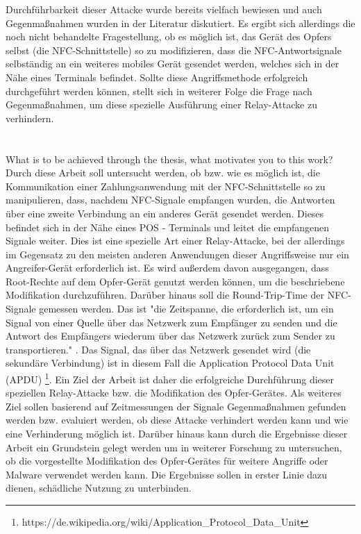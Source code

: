 \documentclass[a4paper,10pt,ngerman]{INSOexpose}
\begin{document}
{Durchführbarkeit dieser Attacke wurde bereits vielfach bewiesen und auch Gegenmaßnahmen wurden in der Literatur diskutiert. Es ergibt sich allerdings die noch nicht behandelte Fragestellung, ob es möglich ist, das Gerät des Opfers selbst (die NFC-Schnittstelle) so zu modifizieren, dass die NFC-Antwortsignale selbständig an ein weiteres mobiles Gerät gesendet werden, welches sich in der Nähe eines Terminals befindet. Sollte diese Angriffsmethode erfolgreich durchgeführt werden können, stellt sich in weiterer Folge die Frage nach Gegenmaßnahmen, um diese spezielle Ausführung einer Relay-Attacke zu verhindern. 
}
\section{}

\langchooser
{
	What is to be achieved through the thesis, what motivates you to this work?
}
{
	Durch diese Arbeit soll untersucht werden, ob bzw. wie es möglich ist, die Kommunikation einer Zahlungsanwendung mit der NFC-Schnittstelle so zu manipulieren, dass, nachdem NFC-Signale empfangen wurden, die Antworten über eine zweite Verbindung an ein anderes Gerät gesendet werden. Dieses befindet sich in der Nähe eines POS - Terminals und leitet die empfangenen Signale weiter. Dies ist eine spezielle Art einer Relay-Attacke, bei der allerdings im Gegensatz zu den meisten anderen Anwendungen dieser Angriffsweise nur ein Angreifer-Gerät erforderlich ist. Es wird außerdem davon ausgegangen, dass Root-Rechte auf dem Opfer-Gerät genutzt werden können, um die beschriebene Modifikation durchzuführen. 
	Darüber hinaus soll die Round-Trip-Time der NFC-Signale gemessen werden. Das ist "die Zeitspanne, die erforderlich ist, um ein Signal von einer Quelle über das Netzwerk zum Empfänger zu senden und die Antwort des Empfängers wiederum über das Netzwerk zurück zum Sender zu transportieren." \cite{rtt}. Das Signal, das über das Netzwerk gesendet wird (die sekundäre Verbindung) ist in diesem Fall die Application Protocol Data Unit (APDU) \footnote{https://de.wikipedia.org/wiki/Application\_Protocol\_Data\_Unit}.
	Ein Ziel der Arbeit ist daher die erfolgreiche Durchführung dieser speziellen Relay-Attacke bzw. die Modifikation des Opfer-Gerätes. Als weiteres Ziel sollen basierend auf Zeitmessungen der Signale Gegenmaßnahmen gefunden werden bzw. evaluiert werden, ob diese Attacke verhindert werden kann und wie eine Verhinderung möglich ist. 
	Darüber hinaus kann durch die Ergebnisse dieser Arbeit ein Grundstein gelegt werden um in weiterer Forschung zu untersuchen, ob die vorgestellte Modifikation des Opfer-Gerätes für weitere Angriffe oder Malware verwendet werden kann. Die Ergebnisse sollen in erster Linie dazu dienen, schädliche Nutzung zu unterbinden. 
}
\end{document}
